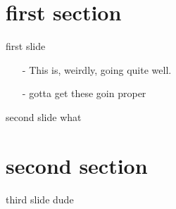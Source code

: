 \documentclass{shard}
\begin{document}
    \section{first section}
    \begin{frame}{first slide}
        \begin{itemize}
            \item[- ] This is, weirdly, going quite well.
            \item[- ] gotta get these goin proper
        \end{itemize}
    \end{frame}
    \begin{frame}{second slide}
        what
    \end{frame}
    \section{second section}
    \begin{frame}{ third slide }
        dude
    \end{frame}
\end{document}
